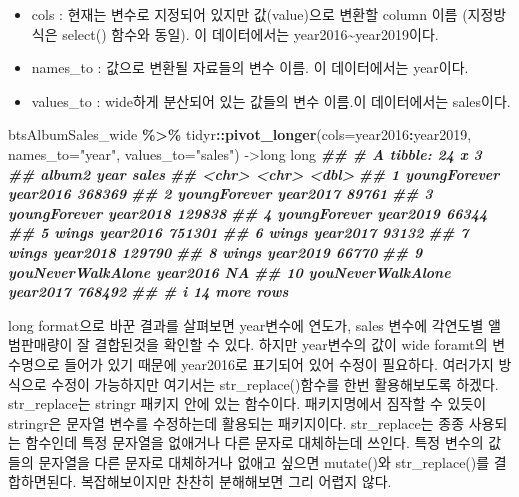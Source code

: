 \documentclass[
]{book}
\newenvironment{Shaded}{\begin{snugshade}}{\end{snugshade}}
\newcommand{\AttributeTok}[1]{\textcolor[rgb]{0.13,0.29,0.53}{#1}}
\newcommand{\DocumentationTok}[1]{\textcolor[rgb]{0.56,0.35,0.01}{\textbf{\textit{#1}}}}
\newcommand{\FunctionTok}[1]{\textcolor[rgb]{0.13,0.29,0.53}{\textbf{#1}}}
\newcommand{\NormalTok}[1]{#1}
\newcommand{\OtherTok}[1]{\textcolor[rgb]{0.56,0.35,0.01}{#1}}
\newcommand{\SpecialCharTok}[1]{\textcolor[rgb]{0.81,0.36,0.00}{\textbf{#1}}}
\newcommand{\StringTok}[1]{\textcolor[rgb]{0.31,0.60,0.02}{#1}}
\providecommand{\tightlist}{%
  \setlength{\itemsep}{0pt}\setlength{\parskip}{0pt}}
\begin{document}
\begin{itemize}
\tightlist
\item
  cols : 현재는 변수로 지정되어 있지만 값(value)으로 변환할 column 이름 (지정방식은 select() 함수와 동일). 이 데이터에서는 year2016\textasciitilde year2019이다.
\item
  names\_to : 값으로 변환될 자료들의 변수 이름. 이 데이터에서는 year이다.
\item
  values\_to : wide하게 분산되어 있는 값들의 변수 이름.이 데이터에서는 sales이다.
\end{itemize}

\begin{Shaded}
\begin{Highlighting}[]
\NormalTok{btsAlbumSales\_wide }\SpecialCharTok{\%\textgreater{}\%} 
\NormalTok{  tidyr}\SpecialCharTok{::}\FunctionTok{pivot\_longer}\NormalTok{(}\AttributeTok{cols=}\NormalTok{year2016}\SpecialCharTok{:}\NormalTok{year2019, }\AttributeTok{names\_to=}\StringTok{"year"}\NormalTok{, }\AttributeTok{values\_to=}\StringTok{"sales"}\NormalTok{) }\OtherTok{{-}\textgreater{}}\NormalTok{long}
\NormalTok{long}
\DocumentationTok{\#\# \# A tibble: 24 x 3}
\DocumentationTok{\#\#    album2            year      sales}
\DocumentationTok{\#\#    \textless{}chr\textgreater{}             \textless{}chr\textgreater{}     \textless{}dbl\textgreater{}}
\DocumentationTok{\#\#  1 youngForever      year2016 368369}
\DocumentationTok{\#\#  2 youngForever      year2017  89761}
\DocumentationTok{\#\#  3 youngForever      year2018 129838}
\DocumentationTok{\#\#  4 youngForever      year2019  66344}
\DocumentationTok{\#\#  5 wings             year2016 751301}
\DocumentationTok{\#\#  6 wings             year2017  93132}
\DocumentationTok{\#\#  7 wings             year2018 129790}
\DocumentationTok{\#\#  8 wings             year2019  66770}
\DocumentationTok{\#\#  9 youNeverWalkAlone year2016     NA}
\DocumentationTok{\#\# 10 youNeverWalkAlone year2017 768492}
\DocumentationTok{\#\# \# i 14 more rows}
\end{Highlighting}
\end{Shaded}

long format으로 바꾼 결과를 살펴보면 year변수에 연도가, sales 변수에 각연도별 앨범판매량이 잘 결합된것을 확인할 수 있다. 하지만 year변수의 값이 wide foramt의 변수명으로 들어가 있기 때문에 year2016로 표기되어 있어 수정이 필요하다. 여러가지 방식으로 수정이 가능하지만 여기서는 str\_replace()함수를 한번 활용해보도록 하겠다. str\_replace는 stringr 패키지 안에 있는 함수이다. 패키지명에서 짐작할 수 있듯이 stringr은 문자열 변수를 수정하는데 활용되는 패키지이다. str\_replace는 종종 사용되는 함수인데 특정 문자열을 없애거나 다른 문자로 대체하는데 쓰인다. 특정 변수의 값들의 문자열을 다른 문자로 대체하거나 없애고 싶으면 mutate()와 str\_replace()를 결합하면된다. 복잡해보이지만 찬찬히 분해해보면 그리 어렵지 않다.
\end{document}
